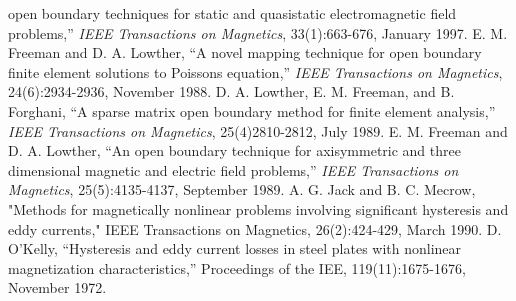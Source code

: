 \begin{thebibliography}{99}
open boundary techniques for static and quasistatic electromagnetic
field problems,'' {\em IEEE Transactions on Magnetics},
33(1):663-676, January 1997.
 E. M. Freeman and D. A. Lowther, ``A novel
mapping technique for open boundary finite element solutions to
Poissons equation,'' {\em IEEE Transactions on Magnetics},
24(6):2934-2936, November 1988.
 D. A. Lowther, E. M. Freeman, and B.
Forghani, ``A sparse matrix open boundary method for finite element
analysis,'' {\em IEEE Transactions on Magnetics}, 25(4)2810-2812,
July 1989.
 E. M. Freeman and D. A. Lowther, ``An open
boundary technique for axisymmetric and three dimensional magnetic
and electric field problems,'' {\em IEEE Transactions on
Magnetics}, 25(5):4135-4137, September 1989.
 A. G. Jack and B. C. Mecrow, "Methods for magnetically nonlinear
problems involving significant hysteresis and eddy currents," IEEE
Transactions on Magnetics, 26(2):424-429, March 1990.
 D. O'Kelly, ``Hysteresis and eddy current losses in
steel plates with nonlinear magnetization characteristics,''
Proceedings of the IEE, 119(11):1675-1676, November 1972.
\end{thebibliography}